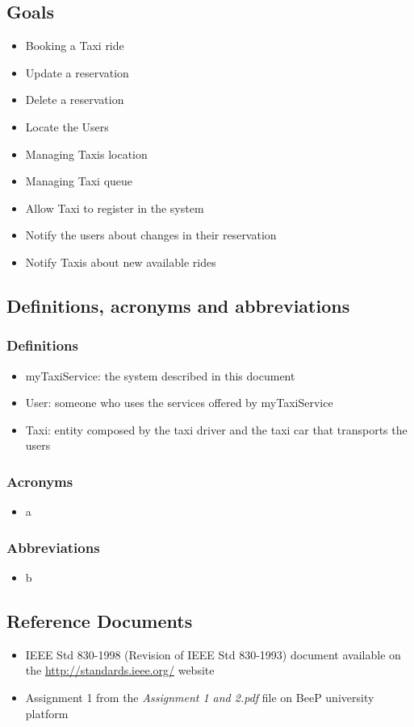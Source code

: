 	\subsection{Goals}
	\begin{itemize}
		\item Booking a Taxi ride
		\item Update a reservation
		\item Delete a reservation
		\item Locate the Users
		\item Managing Taxis location
		\item Managing Taxi queue
		\item Allow Taxi to register in the system
		\item Notify the users about changes in their reservation
		\item Notify Taxis about new available rides
	\end{itemize}
	
	\subsection{Definitions, acronyms and abbreviations}
		\subsubsection{Definitions}
		\begin{itemize}
			\item myTaxiService: the system described in this document
			\item User: someone who uses the services offered by myTaxiService
			\item Taxi: entity composed by the taxi driver and the taxi car that transports the users
		\end{itemize}
		\subsubsection{Acronyms}
		\begin{itemize}
			\item a
		\end{itemize}
		\subsubsection{Abbreviations}
		\begin{itemize}
			\item b
		\end{itemize}
	\subsection{Reference Documents}
	\begin{itemize}
		\item IEEE Std 830-1998 (Revision of IEEE Std 830-1993) document available on the \url{http://standards.ieee.org/} website
		\item Assignment 1 from the \emph{Assignment 1 and 2.pdf} file on BeeP university platform
	\end{itemize}
